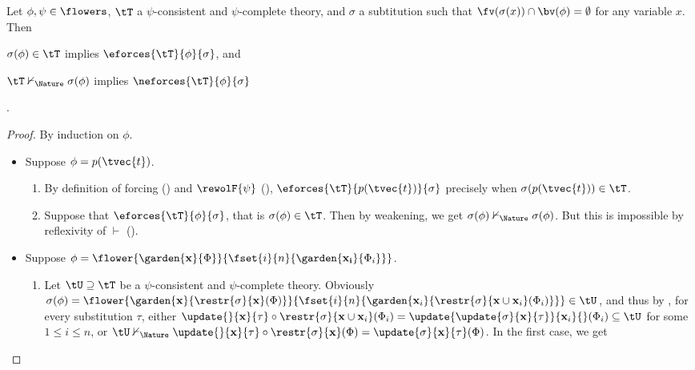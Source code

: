 \begin{lemma}[Adequacy]

  Let $\phi, \psi \in \flowers$, $\tT$ a $\psi$-consistent and $\psi$-complete
  theory, and $\sigma$ a subtitution such that $\fv(\sigma(x)) \cap \bv(\phi) =
  \emptyset$ for any variable $x$. Then
  \begin{enumerate*}
    \item $\sigma(\phi) \in \tT$ implies $\eforces{\tT}{\phi}{\sigma}$, and
    \item $\tT \nvdash_\Nature \sigma(\phi)$ implies $\neforces{\tT}{\phi}{\sigma}$
  \end{enumerate*}.
\end{lemma}
\begin{proof}
  By induction on $\phi$.
  \begin{itemize}
    \item Suppose $\phi = p(\tvec{t})$.
    \begin{enumerate}
      \item By definition of forcing () and $\rewolF{\psi}$
      (), $\eforces{\tT}{p(\tvec{t})}{\sigma}$ precisely when
      $\sigma(p(\tvec{t})) \in \tT$.
      \item Suppose that $\eforces{\tT}{\phi}{\sigma}$, that is $\sigma(\phi) \in
      \tT$. Then by weakening, we get $\sigma(\phi) \nvdash_\Nature \sigma(\phi)$.
      But this is impossible by reflexivity of $\vdash$
      ().
    \end{enumerate}
    \item Suppose $\phi =
    \flower{\garden{\mathbf{x}}{\Phi}}{\fset{i}{n}{\garden{\mathbf{x_i}}{\Phi_i}}}$.
    \begin{enumerate}
      \item Let $\tU \supseteq \tT$ be a $\psi$-consistent and $\psi$-complete
      theory. Obviously $\sigma(\phi) =
      \flower{\garden{\mathbf{x}}{\restr{\sigma}{\mathbf{x}}(\Phi)}}{\fset{i}{n}{\garden{\mathbf{x}_i}{\restr{\sigma}{\mathbf{x}
      \cup \mathbf{x}_i}(\Phi_i)}}} \in \tU$, and thus by
      , for every substitution $\tau$, either $
      \update{}{\mathbf{x}}{\tau} \circ \restr{\sigma}{\mathbf{x} \cup
      \mathbf{x}_i}(\Phi_i) =
      \update{\update{\sigma}{\mathbf{x}}{\tau}}{\mathbf{x}_i}{}(\Phi_i)
      \subseteq \tU$ for some $1 \leq i \leq n$, or $\tU \nvdash_\Nature
      \update{}{\mathbf{x}}{\tau} \circ \restr{\sigma}{\mathbf{x}}(\Phi) =
      \update{\sigma}{\mathbf{x}}{\tau}(\Phi)$. In the first case, we get

\end{enumerate}
\end{itemize}
\end{proof}
